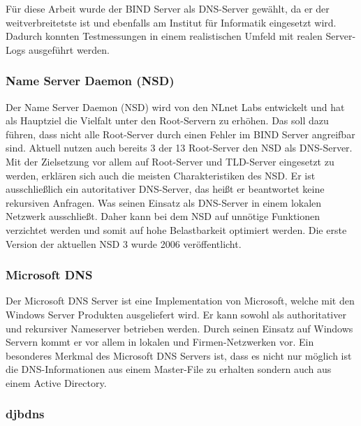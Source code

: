 \documentclass[a4paper, 12pt, BCOR10mm, DIV12, toc=bibliography, toc=listof, german]{scrbook}
\begin{document}
				Für diese Arbeit wurde der BIND Server als DNS-Server gewählt, da er der weitverbreitetste ist und
				ebenfalls am Institut für Informatik eingesetzt wird. Dadurch konnten Testmessungen in einem
				realistischen Umfeld mit realen Server-Logs ausgeführt werden. 
				

				\subsubsection*{Name Server Daemon (NSD)} %

				Der Name Server Daemon (NSD) \cite{nsd} wird von den
				NLnet Labs entwickelt und hat als Hauptziel die Vielfalt unter den Root-Servern zu erhöhen.
				Das soll dazu führen, dass nicht alle Root-Server durch einen Fehler im BIND Server
				angreifbar sind. Aktuell nutzen auch bereits 3 der 13 Root-Server den NSD als DNS-Server.
				Mit der Zielsetzung vor allem auf Root-Server und TLD-Server eingesetzt zu werden, erklären
				sich auch die meisten Charakteristiken des NSD. Er ist ausschließlich ein autoritativer
				DNS-Server, das heißt er beantwortet keine rekursiven Anfragen. Was seinen Einsatz als
				DNS-Server in einem lokalen Netzwerk ausschließt. Daher kann bei dem NSD auf unnötige
				Funktionen verzichtet werden und somit auf hohe Belastbarkeit optimiert werden. Die erste
				Version der aktuellen NSD 3 wurde 2006 veröffentlicht.
				

				\subsubsection*{Microsoft DNS} %

				Der Microsoft DNS Server \cite{msdns} ist eine Implementation
				von Microsoft, welche mit den Windows Server Produkten ausgeliefert wird. Er kann sowohl als
				authoritativer und rekursiver Nameserver betrieben werden. Durch seinen Einsatz auf Windows
				Servern kommt er vor allem in lokalen und Firmen-Netzwerken vor. Ein besonderes Merkmal des
				Microsoft DNS Servers ist, dass es nicht nur möglich ist die DNS-Informationen aus einem
				Master-File zu erhalten sondern auch aus einem Active Directory.
				

				\subsubsection*{djbdns} %
\end{document}
